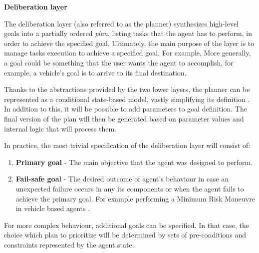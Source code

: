 \documentclass[main.tex]{subfiles}
\begin{document}

\textbf{Deliberation layer}

The deliberation layer (also referred to as the planner) synthesizes high-level goals into a
partially ordered \emph{plan}, listing tasks that the agent has to perform, in order to achieve
the specified goal. Ultimately, the main purpose of the layer is to manage tasks execution to
achieve a specified goal. For example,  More generally, a goal could be something that the user
wants the agent to accomplish, for example, a vehicle's goal is to arrive to its final
destination.

Thanks to the abstractions provided by the two lower layers, the planner can be represented as
a conditional state-based model, vastly simplifying its definition \cite{Bonasso1995}. In
addition to this, it will be possible to add parameters to goal definition. The final version of the plan 
will then be generated based on parameter values and internal logic that will process them.

In practice, the most trivial specification of the deliberation layer will consist of:

\begin{enumerate}[label=\alph*)]
    \item \textbf{Primary goal} - The main objective that the agent was designed to perform.
    \item \textbf{Fail-safe goal} - The desired outcome of agent's behaviour in case an unexpected 
    failure occurs in any its components or when the agent fails to achieve the primary goal. 
    For example performing a Minimum Risk Maneuvre in vehicle based agents
    \cite{WorkingAutonomous2022}. %
 \end{enumerate}

For more complex behaviour, additional goals can be specified. In that case, the choice which 
plan to prioritize will be determined by sets of pre-conditions and constraints represented by
the agent state.
\end{document}
